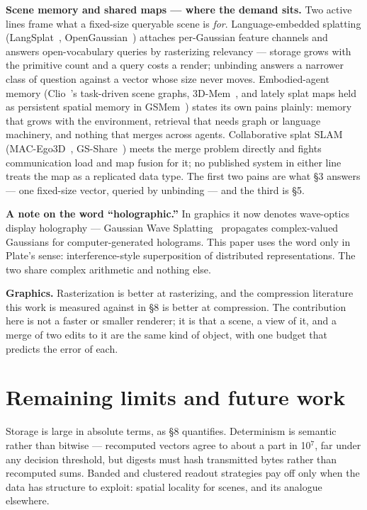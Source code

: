 \documentclass[11pt]{article}
\begin{document}
\textbf{Scene memory and shared maps --- where the demand sits.} Two
active lines frame what a fixed-size queryable scene is \emph{for}.
Language-embedded splatting (LangSplat~\cite{qin2023langsplat},
OpenGaussian~\cite{wu2024opengaussian}) attaches per-Gaussian feature
channels and answers open-vocabulary queries by rasterizing relevancy
--- storage grows with the primitive count and a query costs a render;
unbinding answers a narrower class of question against a vector whose
size never moves. Embodied-agent memory (Clio~\cite{maggio2024clio}'s
task-driven scene graphs, 3D-Mem~\cite{yang20243dmem}, and lately splat
maps held as persistent spatial memory in GSMem~\cite{lu2026gsmem})
states its own pains plainly: memory that grows with the environment,
retrieval that needs graph or language machinery, and nothing that
merges across agents. Collaborative splat SLAM
(MAC-Ego3D~\cite{xu2024macego3d}, GS-Share~\cite{zhang2025gsshare})
meets the merge problem directly and fights communication load and map
fusion for it; no published system in either line treats the map as a
replicated data type. The first two pains are what \S3 answers --- one
fixed-size vector, queried by unbinding --- and the third is \S5.

\textbf{A note on the word ``holographic.''} In graphics it now denotes
wave-optics display holography --- Gaussian Wave
Splatting~\cite{choi2025gaussianwave} propagates complex-valued
Gaussians for computer-generated holograms. This paper uses the word
only in Plate's sense: interference-style superposition of distributed
representations. The two share complex arithmetic and nothing else.

\textbf{Graphics.} Rasterization is better at rasterizing, and the
compression literature~\cite{ali2025compression} this work is measured
against in \S8 is better at compression. The contribution here is not a
faster or smaller renderer; it is that a scene, a view of it, and a
merge of two edits to it are the same kind of object, with one budget
that predicts the error of each.

\section{Remaining limits and future work}

Storage is large in absolute terms, as \S8 quantifies. Determinism is
semantic rather than bitwise --- recomputed vectors agree to about a
part in 10$^7$, far under any decision threshold, but digests must hash
transmitted bytes rather than recomputed sums. Banded and clustered
readout strategies pay off only when the data has structure to exploit:
spatial locality for scenes, and its analogue elsewhere.
\end{document}
